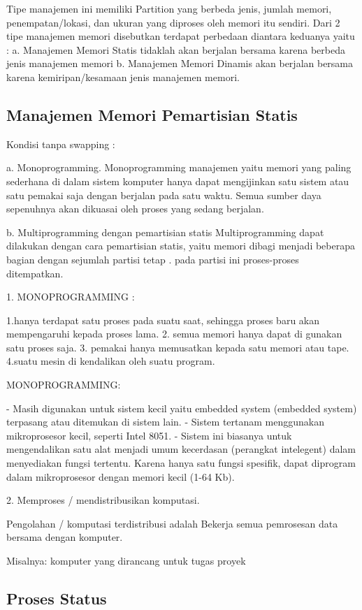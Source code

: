 Tipe manajemen ini memiliki Partition yang berbeda jenis, jumlah memori, penempatan/lokasi, dan ukuran yang diproses
oleh memori itu sendiri. Dari 2 tipe manajemen memori disebutkan terdapat perbedaan diantara keduanya yaitu :
a. Manajemen Memori Statis  tidaklah akan berjalan bersama karena berbeda jenis manajemen memori
b. Manajemen Memori Dinamis akan berjalan bersama karena kemiripan/kesamaan jenis manajemen memori.

\subsection {Manajemen Memori Pemartisian Statis}

Kondisi tanpa swapping :

a. Monoprogramming.
Monoprogramming manajemen yaitu memori yang paling sederhana di dalam sistem komputer hanya dapat mengijinkan satu sistem atau satu pemakai saja dengan berjalan pada satu waktu. Semua sumber daya sepenuhnya akan dikuasai oleh proses yang sedang berjalan.

b. Multiprogramming dengan pemartisian statis
Multiprogramming dapat dilakukan dengan cara pemartisian statis, yaitu memori dibagi menjadi beberapa bagian dengan sejumlah partisi tetap . pada partisi ini proses-proses ditempatkan.

1. MONOPROGRAMMING :

	1.hanya terdapat satu proses pada suatu saat, sehingga proses baru akan mempengaruhi kepada proses lama.
	2. semua memori hanya dapat di gunakan satu proses saja.
	3. pemakai hanya memusatkan kepada satu memori atau tape.
	4.suatu mesin di kendalikan oleh suatu program.

		MONOPROGRAMMING:

	- Masih digunakan untuk sistem kecil yaitu embedded system (embedded system) terpasang atau ditemukan di sistem lain.
	- Sistem tertanam menggunakan mikroprosesor kecil, seperti Intel 8051.
	- Sistem ini biasanya untuk mengendalikan satu alat menjadi umum kecerdasan (perangkat intelegent) dalam menyediakan fungsi tertentu. Karena hanya satu fungsi spesifik, dapat diprogram dalam mikroprosesor dengan memori kecil (1-64 Kb).

2. Memproses / mendistribusikan komputasi.

Pengolahan / komputasi terdistribusi adalah Bekerja semua pemrosesan data bersama dengan komputer.

Misalnya: komputer yang dirancang untuk tugas proyek

\subsection {Proses Status}


